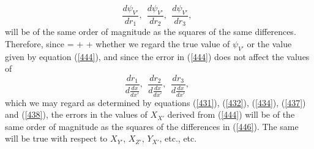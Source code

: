 \documentclass[12pt]{article}
\begin{document}
{$$\frac{d\psi_{V'}}{dr_1}, \ \ \frac{d\psi_{V'}}{dr_2}, \ \ \frac{d\psi_{V'}}{dr_3}, \ \ $$
will be of the same order of magnitude as the squares of the same differences. Therefore, since
\eqs {}=  +  +          \label{447}\eqe
whether we regard the true value of $\psi_{V'}$ or the value given by equation (\ref{444}), and since the error in (\ref{444}) does not affect the values of
$$ \frac{dr_1}{d\frac{dx}{dx'}},\ \ \frac{dr_2}{d\frac{dx}{dx'}},\ \ \frac{dr_3}{d\frac{dx}{dx'}},\ \ $$
which we may regard as determined by equations (\ref{431}), (\ref{432}), (\ref{434}), (\ref{437}) and (\ref{438}), the errors in the values of $X_{X'}$ derived from (\ref{444}) will be of the same order of magnitude as the squares of the differences in (\ref{446}). The same will be true with respect to $X_{Y'}$, $X_{Z'}$, $Y_{X'}$, etc., etc.


}
\end{document}
